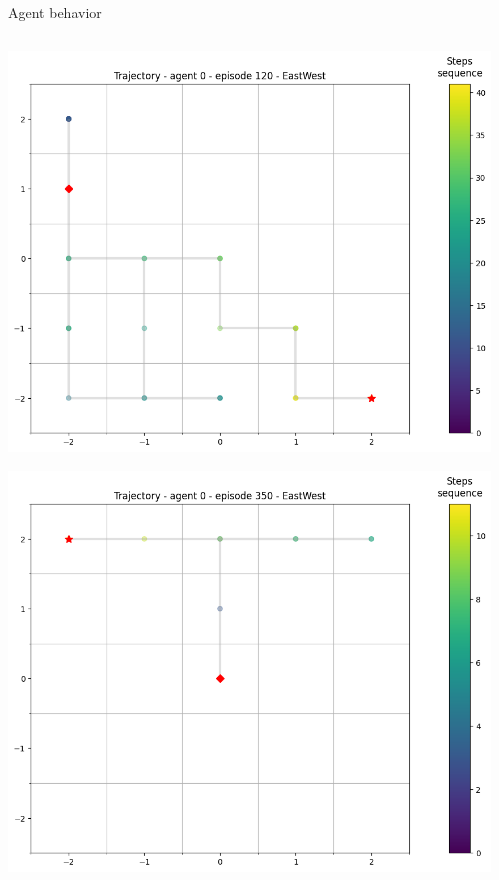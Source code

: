 \documentclass[bigger]{beamer}
\begin{document}
\begin{frame}[label={sec:org89e314c}]{Agent behavior}
\begin{columns}
\begin{column}[c]{0.3\columnwidth}
\begin{center}
\includegraphics[height=0.28\textheight]{img/trajectory-0-120-EastWest.png}
\end{center}
\begin{center}
\includegraphics[height=0.28\textheight]{img/trajectory-0-350-EastWest.png}
\end{center}
\end{column}
\begin{column}[c]{0.25\columnwidth}
\begin{center}

\end{center}
\end{column}
\end{columns}
\end{frame}
\end{document}
